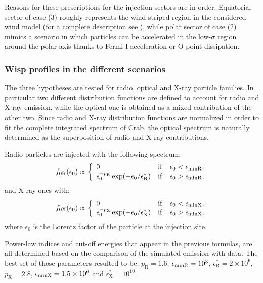 Reasons for these prescriptions for the injection sectors are in order. Equatorial sector of case (3) roughly represents the wind striped region in the considered wind model (for a complete description see \citet{Olmi:2014}), while polar sector of case (2) mimics a scenario in which particles can be accelerated in the low-$\sigma$ region around the polar axis thanks to Fermi I acceleration or O-point dissipation.

\subsubsection{Wisp profiles in the different scenarios}

The three hypotheses are tested for radio, optical and X-ray particle families.
In particular two different distribution functions are defined to account for radio and X-ray emission, while the optical one is obtained as a mixed contribution of the other two. 
Since radio and X-ray distribution functions are normalized in order to fit the complete integrated spectrum of Crab, the optical spectrum is naturally determined as the superposition of radio and X-ray contributions.

Radio particles are injected with the following spectrum:
\begin{equation}
f_{0\mathrm{R}}(\epsilon_0)\propto \left\{
\begin{array}{lcl}
0 & {\rm if} & \epsilon_0 < \epsilon_{\rm minR}, \\
\epsilon_0^{-p_\mathrm{R}} \exp(-\epsilon_0/\epsilon_\mathrm{R}^*) &  {\rm if} & \epsilon_0 > \epsilon_{\rm minR},\\
\end{array}
\right.
\end{equation}
and X-ray ones with:
\begin{equation}
 f_{0\mathrm{X}}(\epsilon_0)\propto \left\{ 
 \begin{array}{lcl}
 0 & {\rm if} & \epsilon_0 < \epsilon_{\rm minX}, \\
\epsilon_0^{-p_\mathrm{X}} \exp(-\epsilon_0/\epsilon_\mathrm{X}^*) &  {\rm if} & \epsilon_0 > \epsilon_{\rm minX}, \\
\end{array}
\right.
 \label{eq:Xpart}
\end{equation}
 where $\epsilon_0$ is the Lorentz factor of the particle at the injection site.
 
Power-law indices and cut-off energies that appear in the previous formulas, are all determined based on the comparison of the simulated emission with data. The best set of those parameters resulted to be: $p_\mathrm{R}=1.6$, $\epsilon_{\rm minR}=10^3$, $\epsilon_\mathrm{R}^*=2 \times10^6$, $p_\mathrm{X}=2.8$, $\epsilon_{\rm minX}=1.5 \times 10^6$ and $\epsilon_\mathrm{X}^*=10^{10}$.


